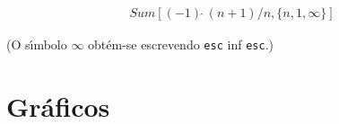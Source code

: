 \documentclass[11pt]{article}
\begin{document}
\begin{itemize}
\[\begin{array}{l}
Sum[(-1)\,\hat{}\,(n + 1)/n, \{n, 1,\infty \}]





 \end{array}
\]


(O s\'\i mbolo $\infty$ obt\'em-se  escrevendo \texttt{esc} inf \texttt{esc}.)


\pagebreak 



   \end{itemize}
   
   
  \section{Gr\'aficos} 
  
\end{document}
